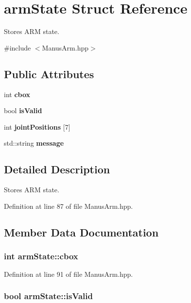 \section{arm\-State \-Struct \-Reference}
\label{structarmState}


\-Stores \-A\-R\-M state.  




{\ttfamily \#include $<$\-Manus\-Arm.\-hpp$>$}

\subsection*{\-Public \-Attributes}
\begin{DoxyCompactItemize}
\item 
int {\bf cbox}
\item 
bool {\bf is\-Valid}
\item 
int {\bf joint\-Positions} [7]
\item 
std\-::string {\bf message}
\end{DoxyCompactItemize}


\subsection{\-Detailed \-Description}
\-Stores \-A\-R\-M state. 

\-Definition at line 87 of file \-Manus\-Arm.\-hpp.



\subsection{\-Member \-Data \-Documentation}
\subsubsection[{cbox}]{\setlength{\rightskip}{0pt plus 5cm}int {\bf arm\-State\-::cbox}}\label{structarmState_a1fc8092eb5a00eb0fde26a2bf8110344}


\-Definition at line 91 of file \-Manus\-Arm.\-hpp.

\subsubsection[{is\-Valid}]{\setlength{\rightskip}{0pt plus 5cm}bool {\bf arm\-State\-::is\-Valid}}\label{structarmState_ad1648fd84fe049f22366eb1152e312c6}


